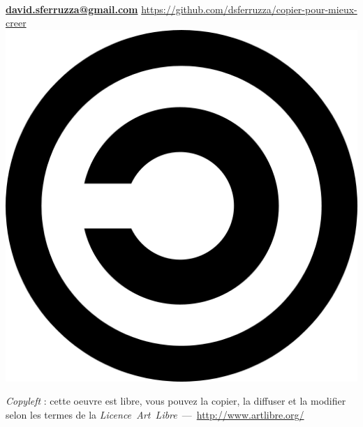 \begin{titlepage}
\begin{center}
\begin{minipage}[c]{9cm}
	\begin{center}
	\textbf{\titre}
	\linebreak
	\linebreak
	\moi\\
	\textbf{\href{mailto:david.sferruzza@gmail.com}{david.sferruzza@gmail.com}}
	\linebreak
	\linebreak
	\linebreak
	{\footnotesize \url{https://github.com/dsferruzza/copier-pour-mieux-creer}}
	\linebreak
	\linebreak
	\linebreak
	\includegraphics[scale=.05]{images/copyleft.png} 
	\end{center}
	\textit{Copyleft} : cette oeuvre est libre, vous pouvez la copier,
	la diffuser et la modifier selon les termes de la
	\textit{Licence~Art~Libre}~---~\url{http://www.artlibre.org/}
\end{minipage}
\end{center}
\vfill ~
\end{titlepage}

